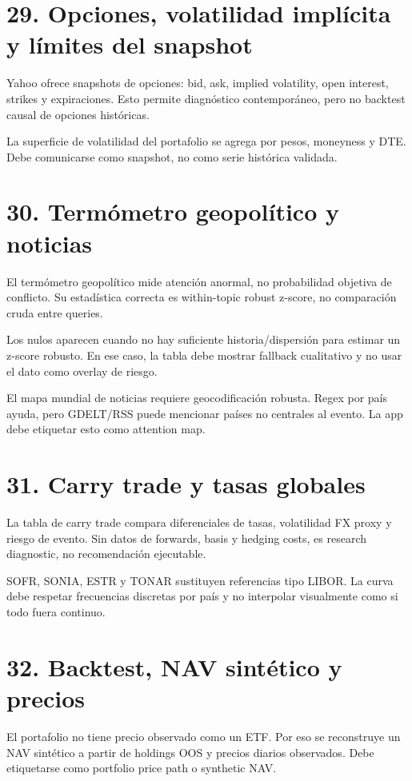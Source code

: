 \documentclass[11pt,letterpaper]{article}
\begin{document}
\section{29. Opciones, volatilidad implícita y límites del snapshot}
Yahoo ofrece snapshots de opciones: bid, ask, implied volatility, open interest, strikes y expiraciones. Esto permite diagnóstico contemporáneo, pero no backtest causal de opciones históricas.

La superficie de volatilidad del portafolio se agrega por pesos, moneyness y DTE. Debe comunicarse como snapshot, no como serie histórica validada.

\section{30. Termómetro geopolítico y noticias}
El termómetro geopolítico mide atención anormal, no probabilidad objetiva de conflicto. Su estadística correcta es within-topic robust z-score, no comparación cruda entre queries.

Los nulos aparecen cuando no hay suficiente historia/dispersión para estimar un z-score robusto. En ese caso, la tabla debe mostrar fallback cualitativo y no usar el dato como overlay de riesgo.

El mapa mundial de noticias requiere geocodificación robusta. Regex por país ayuda, pero GDELT/RSS puede mencionar países no centrales al evento. La app debe etiquetar esto como attention map.

\section{31. Carry trade y tasas globales}
La tabla de carry trade compara diferenciales de tasas, volatilidad FX proxy y riesgo de evento. Sin datos de forwards, basis y hedging costs, es research diagnostic, no recomendación ejecutable.

SOFR, SONIA, ESTR y TONAR sustituyen referencias tipo LIBOR. La curva debe respetar frecuencias discretas por país y no interpolar visualmente como si todo fuera continuo.

\section{32. Backtest, NAV sintético y precios}
El portafolio no tiene precio observado como un ETF. Por eso se reconstruye un NAV sintético a partir de holdings OOS y precios diarios observados. Debe etiquetarse como portfolio price path o synthetic NAV.
\end{document}
